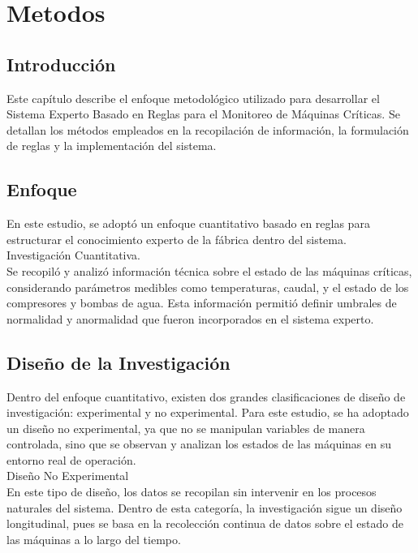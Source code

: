 \fancyhead{}
\fancyfoot{}
\cfoot{\thepage}


\chapter{Metodos}

\section{Introducción }


Este capítulo describe el enfoque metodológico utilizado para desarrollar el Sistema Experto Basado en Reglas para el Monitoreo de Máquinas Críticas. Se detallan los métodos empleados en la recopilación de información, la formulación de reglas y la implementación del sistema. \\
\section{Enfoque}
En este estudio, se adoptó un enfoque cuantitativo basado en reglas para estructurar el conocimiento experto de la fábrica dentro del sistema. \\
Investigación Cuantitativa. \\
Se recopiló y analizó información técnica sobre el estado de las máquinas críticas, considerando parámetros medibles como temperaturas, caudal, y el estado de los compresores y bombas de agua. Esta información permitió definir umbrales de normalidad y anormalidad que fueron incorporados en el sistema experto. \\
\section{Diseño de la Investigación}
Dentro del enfoque cuantitativo, existen dos grandes clasificaciones de diseño de investigación: experimental y no experimental. Para este estudio, se ha adoptado un diseño no experimental, ya que no se manipulan variables de manera controlada, sino que se observan y analizan los estados de las máquinas en su entorno real de operación. \\
Diseño No Experimental \\
En este tipo de diseño, los datos se recopilan sin intervenir en los procesos naturales del sistema. Dentro de esta categoría, la investigación sigue un diseño longitudinal, pues se basa en la recolección continua de datos sobre el estado de las máquinas a lo largo del tiempo. \\

